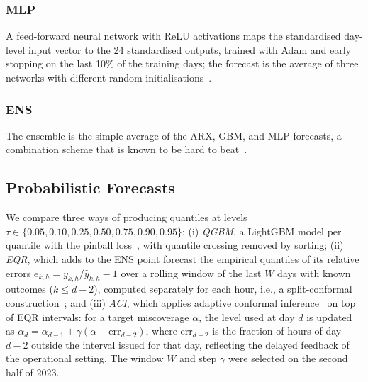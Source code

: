 \subsubsection{MLP}
A feed-forward neural network with ReLU activations maps the standardised day-level input vector to the 24 standardised outputs, trained with Adam and early stopping on the last 10\% of the training days; the forecast is the average of three networks with different random initialisations~\cite{pedregosa2011sklearn}.

\subsubsection{ENS}
The ensemble is the simple average of the ARX, GBM, and MLP forecasts, a combination scheme that is known to be hard to beat~\cite{petropoulos2022forecasting}.

\subsection{Probabilistic Forecasts}
We compare three ways of producing quantiles at levels $\tau\in\{0.05,0.10,0.25,0.50,0.75,0.90,0.95\}$:
(i) \emph{QGBM}, a LightGBM model per quantile with the pinball loss~\cite{koenker1978quantiles}, with quantile crossing removed by sorting;
(ii) \emph{EQR}, which adds to the ENS point forecast the empirical quantiles of its relative errors $e_{k,h}=y_{k,h}/\hat y_{k,h}-1$ over a rolling window of the last $W$ days with known outcomes ($k\le d-2$), computed separately for each hour, i.e., a split-conformal construction~\cite{vovk2022alrw}; and
(iii) \emph{ACI}, which applies adaptive conformal inference~\cite{gibbs2021aci} on top of EQR intervals: for a target miscoverage $\alpha$, the level used at day $d$ is updated as $\alpha_{d}=\alpha_{d-1}+\gamma(\alpha-\mathrm{err}_{d-2})$, where $\mathrm{err}_{d-2}$ is the fraction of hours of day $d-2$ outside the interval issued for that day, reflecting the delayed feedback of the operational setting. The window $W$ and step $\gamma$ were selected on the second half of 2023.

